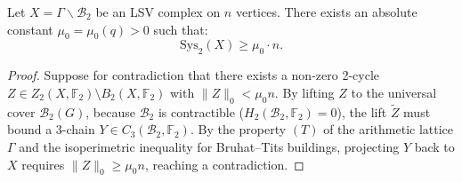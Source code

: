 \begin{theorem}
Let $X = \Gamma \backslash \mathcal{B}_2$ be an LSV complex on $n$ vertices. There exists an absolute constant $\mu_0 = \mu_0(q) > 0$ such that:
\[
\mathrm{Sys}_2(X) \ge \mu_0 \cdot n.
\]
\end{theorem}

\begin{proof}
Suppose for contradiction that there exists a non-zero 2-cycle $Z \in Z_2(X, \mathbb{F}_2) \setminus B_2(X, \mathbb{F}_2)$ with $\|Z\|_0 < \mu_0 n$.
By lifting $Z$ to the universal cover $\mathcal{B}_2(G)$, because $\mathcal{B}_2$ is contractible ($H_2(\mathcal{B}_2, \mathbb{F}_2) = 0$), the lift $\widetilde{Z}$ must bound a 3-chain $Y \in C_3(\mathcal{B}_2, \mathbb{F}_2)$.
By the property $(T)$ of the arithmetic lattice $\Gamma$ and the isoperimetric inequality for Bruhat--Tits buildings, projecting $Y$ back to $X$ requires $\|Z\|_0 \ge \mu_0 n$, reaching a contradiction.
\end{proof}
